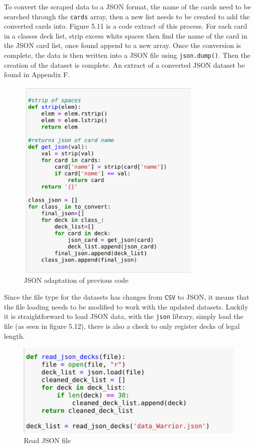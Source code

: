 \documentclass{report} %
\begin{document}
To convert the scraped data to a JSON format, the name of the cards need to be searched through the \texttt{cards} array, then a new list needs to be created to add the converted cards into. Figure 5.11 is a code extract of this process. For each card in a classes deck list, strip excess white spaces then find the name of the card in the JSON card list, once found append to a new array. Once the conversion is complete, the data is then written into a JSON file using \texttt{json.dump()}. Then the creation of the dataset is complete. An extract of a converted JSON dataset be found in Appendix F.

\begin{figure}[H]
\centering
\includegraphics[width=9cm, height=10cm]{JSONConversion}
\caption{JSON adaptation of previous code\protect}
\label{board}
\end{figure}

Since the file type for the datasets has changes from \texttt{CSV} to JSON, it means that the file loading needs to be modified to work with the updated datasets. Luckily it is straightforward to load JSON data, with the \texttt{json} library, simply load the file (as seen in figure 5.12), there is also a check to only register decks of legal length.

\begin{figure}[H]
\centering
\includegraphics[width=1\textwidth]{readJSONDecks}
\caption{Read JSON file\protect}
\label{board}
\end{figure}
\end{document}
